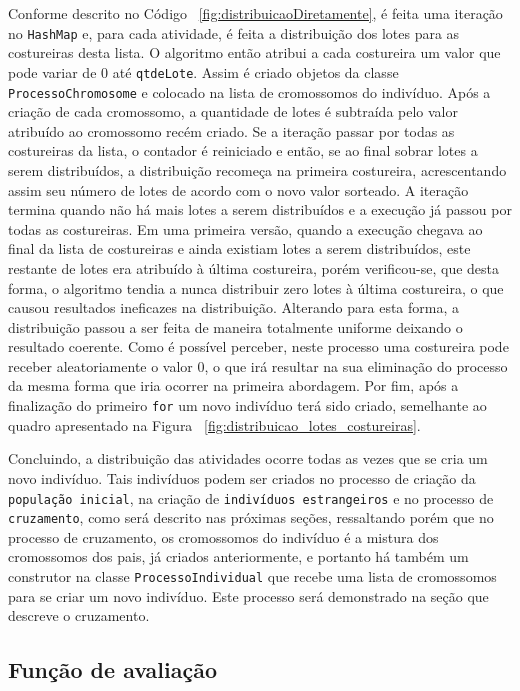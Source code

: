\par Conforme descrito no Código ~\ref{fig:distribuicaoDiretamente}, é feita uma
iteração no \texttt{HashMap} e, para cada atividade, é feita a distribuição dos lotes para
as costureiras desta lista. O algoritmo então atribui a cada costureira um valor
que pode variar de 0 até \texttt{qtdeLote}. Assim é criado objetos da classe \texttt{ProcessoChromosome} 
e colocado na lista de cromossomos do indivíduo. Após a criação de cada cromossomo, a quantidade de
lotes é subtraída pelo valor atribuído ao cromossomo recém criado.
Se a iteração passar por todas as costureiras da lista, o contador é reiniciado e então, se ao final sobrar 
lotes a serem distribuídos, a distribuição recomeça na primeira costureira, acrescentando assim seu 
número de lotes de acordo com o novo valor sorteado. A iteração termina quando não há mais lotes a serem 
distribuídos e a execução já passou por todas as costureiras. Em uma primeira versão, quando a execução chegava
ao final da lista de costureiras e ainda existiam lotes a serem distribuídos, este restante de lotes era atribuído
à última costureira, porém verificou-se, que desta forma, o algoritmo tendia a nunca distribuir zero lotes à última
costureira, o que causou resultados ineficazes na distribuição. Alterando para esta forma, a distribuição  passou a 
ser feita de maneira totalmente uniforme deixando o resultado coerente.
Como é possível perceber, neste processo uma costureira pode receber aleatoriamente o valor 0, o que irá resultar na 
sua eliminação do processo da mesma forma que iria ocorrer na primeira abordagem. Por fim, após a finalização do primeiro
\texttt{for} um novo indivíduo terá sido criado, semelhante ao quadro
apresentado na Figura ~\ref{fig:distribuicao_lotes_costureiras}.

\par Concluindo, a distribuição das atividades ocorre todas as vezes que se cria um novo indivíduo.
Tais indivíduos podem ser criados no processo de criação da \texttt{população inicial}, na criação de 
\texttt{indivíduos estrangeiros} e no processo de \texttt{cruzamento}, como será descrito nas próximas seções,
ressaltando porém que no processo de cruzamento, os cromossomos do indivíduo é a mistura dos cromossomos dos pais,
já criados anteriormente, e portanto há também um construtor na classe \texttt{ProcessoIndividual} que recebe uma lista de 
cromossomos para se criar um novo indivíduo. Este processo será demonstrado na seção que descreve o cruzamento.


\subsection{Função de avaliação}

